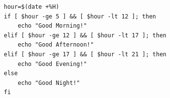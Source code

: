 \begin{verbatim}
hour=$(date +%H)
if [ $hour -ge 5 ] && [ $hour -lt 12 ]; then
    echo "Good Morning!"
elif [ $hour -ge 12 ] && [ $hour -lt 17 ]; then
    echo "Good Afternoon!"
elif [ $hour -ge 17 ] && [ $hour -lt 21 ]; then
    echo "Good Evening!"
else
    echo "Good Night!"
fi
\end{verbatim}